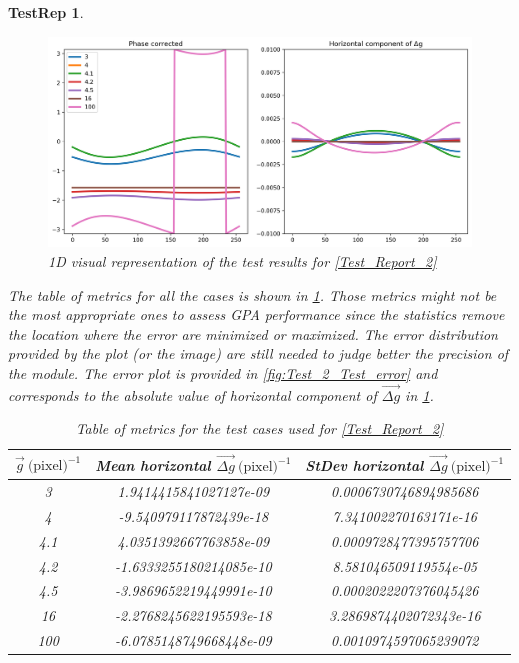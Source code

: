 \documentclass[12pt, titlepage]{article}
\newtheorem{TestRep}{TestRep}
\begin{document}
\begin{TestRep}
\begin{figure}[H]
\begin{center}
\includegraphics[scale=0.5]{Figures/Test_2_test_results.png}
\caption{1D visual representation of the test results for \cref{Test_Report_2}}
\label{fig:Test_2_Test_results}
\end{center}
\end{figure}

The table of metrics for all the cases is shown in 
\cref{tb:Metric_test_2_multiple_cases}. Those metrics might not be the most 
appropriate ones to assess GPA performance since the statistics remove the 
location where the error are minimized or maximized. The error distribution 
provided by the plot (or the image) are still needed to judge better the 
precision of the module. The error plot is provided in 
\cref{fig:Test_2_Test_error} and corresponds to the absolute value of horizontal 
component of $\overrightarrow{\Delta g}$ in \cref{fig:Test_2_Test_results}.

\begin{table}[H]
\centering
\begin{tabular}{|c|c|c|}
\hline
$\overrightarrow{g} \ \text{(pixel)}^{-1}$ & Mean horizontal 
$\overrightarrow{\Delta g} \ \text{(pixel)}^{-1}$ & StDev horizontal 
$\overrightarrow{\Delta g} \ \text{(pixel)}^{-1}$ \\
\hline
3 & 1.9414415841027127e-09 & 0.0006730746894985686 \\ \hline
\cellcolor{green} 4	 & \cellcolor{green} -9.540979117872439e-18 & 
\cellcolor{green} 7.341002270163171e-16 \\ \hline
\cellcolor[rgb]{1,0.8,0} 4.1 & \cellcolor[rgb]{1,0.8,0} 4.0351392667763858e-09 & 
\cellcolor[rgb]{1,0.8,0} 0.0009728477395757706 \\ \hline
4.2	& -1.6333255180214085e-10 & 8.581046509119554e-05 \\ \hline
4.5	& -3.9869652219449991e-10 & 0.0002022207376045426 \\ \hline
\cellcolor{green} 16 & \cellcolor{green} -2.2768245622195593e-18 & 
\cellcolor{green} 3.2869874402072343e-16 \\ \hline
\cellcolor[rgb]{1,0.8,0} 100 & \cellcolor[rgb]{1,0.8,0} -6.0785148749668448e-09 
& \cellcolor[rgb]{1,0.8,0} 0.0010974597065239072 \\ \hline
\end{tabular}
\caption{Table of metrics for the test cases used for 
\cref{Test_Report_2}}\label{tb:Metric_test_2_multiple_cases}
\end{table}


\end{TestRep}
\end{document}
